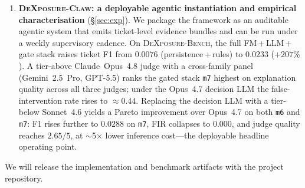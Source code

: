 \begin{enumerate}[leftmargin=*, itemsep=2pt]
    \item \textbf{\textsc{DeXposure-Claw}: a deployable agentic instantiation and empirical characterisation} (\S\ref{sec:exp}). We package the framework as an auditable agentic system that emits ticket-level evidence bundles and can be run under a weekly supervisory cadence. On \textsc{DeXposure-Bench}, the full FM\,+\,LLM\,+\,gate stack raises ticket F1 from $0.0076$ (persistence\,+\,rules) to $0.0233$ (\textbf{$+207\%$}). A tier-above Claude~Opus~4.8 judge with a cross-family panel (Gemini~2.5~Pro, GPT-5.5) ranks the gated stack \texttt{m7} highest on explanation quality across all three judges; under the Opus~4.7 decision LLM the false-intervention rate rises to $\approx 0.44$. Replacing the decision LLM with a tier-below Sonnet~4.6 yields a Pareto improvement over Opus~4.7 on both \texttt{m6} and \texttt{m7}: F1 rises further to $0.0288$ on \texttt{m7}, FIR collapses to $0.000$, and judge quality reaches $2.65/5$, at $\sim$5$\times$ lower inference cost---the deployable headline operating point.
\end{enumerate}

We will release the implementation and benchmark artifacts with the project repository.
